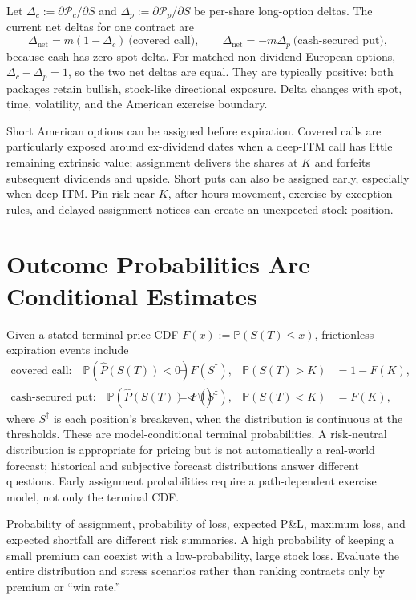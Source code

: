\documentclass[11pt]{article}
\begin{document}
Let $\Delta_c:=\partial\mathcal P_c/\partial S$ and $\Delta_p:=\partial\mathcal P_p/\partial S$ be per-share long-option deltas. The current net deltas for one contract are
\begin{equation}
  \label{eq:position-deltas}
  \Delta_{\text{net}}=m(1-\Delta_c)\ \text{(covered call)},
  \qquad
  \Delta_{\text{net}}=-m\Delta_p\ \text{(cash-secured put)},
\end{equation}
because cash has zero spot delta. For matched non-dividend European options, $\Delta_c-\Delta_p=1$, so the two net deltas are equal. They are typically positive: both packages retain bullish, stock-like directional exposure. Delta changes with spot, time, volatility, and the American exercise boundary.

Short American options can be assigned before expiration. Covered calls are particularly exposed around ex-dividend dates when a deep-ITM call has little remaining extrinsic value; assignment delivers the shares at $K$ and forfeits subsequent dividends and upside. Short puts can also be assigned early, especially when deep ITM. Pin risk near $K$, after-hours movement, exercise-by-exception rules, and delayed assignment notices can create an unexpected stock position.

\section{Outcome Probabilities Are Conditional Estimates}

Given a stated terminal-price CDF $F(x):=\mathbb P(S(T)\leq x)$, frictionless expiration events include
\begin{align}
  \label{eq:covered-call-events}
  \text{covered call:}\quad\mathbb P\left(\hat P(S(T))<0\right)&=F(S^{\ddagger}),
  &
  \mathbb P(S(T)>K)&=1-F(K),\\
  \label{eq:csp-events}
  \text{cash-secured put:}\quad\mathbb P\left(\hat P(S(T))<0\right)&=F(S^{\ddagger}),
  &
  \mathbb P(S(T)<K)&=F(K),
\end{align}
where $S^{\ddagger}$ is each position's breakeven, when the distribution is continuous at the thresholds. These are model-conditional terminal probabilities. A risk-neutral distribution is appropriate for pricing but is not automatically a real-world forecast; historical and subjective forecast distributions answer different questions. Early assignment probabilities require a path-dependent exercise model, not only the terminal CDF.

Probability of assignment, probability of loss, expected P\&L, maximum loss, and expected shortfall are different risk summaries. A high probability of keeping a small premium can coexist with a low-probability, large stock loss. Evaluate the entire distribution and stress scenarios rather than ranking contracts only by premium or ``win rate.''
\end{document}

